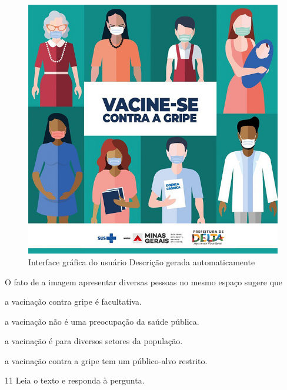 \begin{figure}
\centering
\includegraphics[width=\textwidth]{./imgQ4PORT/media/image7.jpeg}
\caption{Interface gráfica do usuário Descrição gerada automaticamente}
\end{figure}


O fato de a imagem apresentar diversas pessoas no mesmo espaço sugere
que

\begin{escolha}
  \item a vacinação contra gripe é facultativa.

  \item a vacinação não é uma preocupação da saúde pública.

  \item a vacinação é para diversos setores da população.

  \item a vacinação contra a gripe tem um público-alvo restrito.
\end{escolha}

\num{11} Leia o texto e responda à pergunta.


